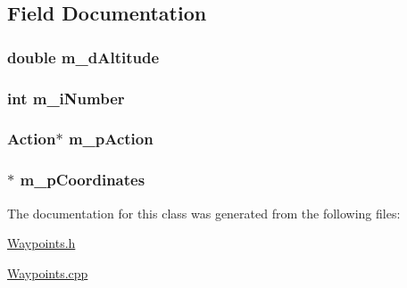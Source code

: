 \subsection{Field Documentation}
\hypertarget{a00017_a79a2bd07a373f3b0042e6c2dc0e51fc0}{
\subsubsection[{m\-\_\-d\-Altitude}]{\setlength{\rightskip}{0pt plus 5cm}double m\-\_\-d\-Altitude\hspace{0.3cm}{\ttfamily [private]}}}\label{a00017_a79a2bd07a373f3b0042e6c2dc0e51fc0}
\hypertarget{a00017_a9fb4f1b5ca39cdbcb7142c90feb5f38f}{
\subsubsection[{m\-\_\-i\-Number}]{\setlength{\rightskip}{0pt plus 5cm}int m\-\_\-i\-Number\hspace{0.3cm}{\ttfamily [private]}}}\label{a00017_a9fb4f1b5ca39cdbcb7142c90feb5f38f}
\hypertarget{a00017_a63916589fa097ccd19239948429b55f7}{
\subsubsection[{m\-\_\-p\-Action}]{\setlength{\rightskip}{0pt plus 5cm}Action$\ast$ m\-\_\-p\-Action\hspace{0.3cm}{\ttfamily [private]}}}\label{a00017_a63916589fa097ccd19239948429b55f7}
\hypertarget{a00017_a1900c34e2c85593efdee3d7436c508b3}{
\subsubsection[{m\-\_\-p\-Coordinates}]{$\ast$ m\-\_\-p\-Coordinates\hspace{0.3cm}{\ttfamily [private]}}}\label{a00017_a1900c34e2c85593efdee3d7436c508b3}


The documentation for this class was generated from the following files\-:\begin{DoxyCompactItemize}
\item 
\hyperlink{a00047}{Waypoints.\-h}\item 
\hyperlink{a00046}{Waypoints.\-cpp}\end{DoxyCompactItemize}
